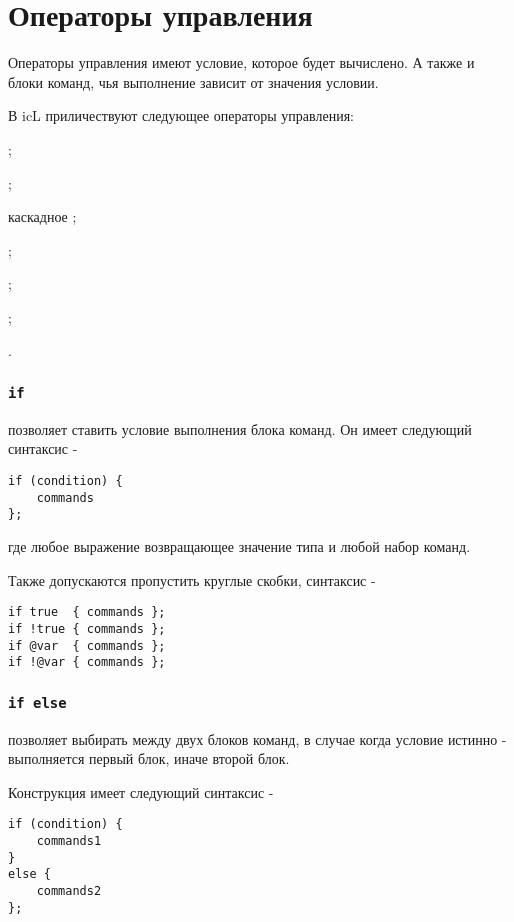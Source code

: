 \section{Операторы управления}

Операторы управления имеют условие, которое будет вычислено. А также и блоки команд, чья выполнение зависит от значения условии.

В icL приличествуют следующее операторы управления:
\begin{icItems}
	\item {};
	\item {};
	\item каскадное ;
	\item {};
	\item {};
	\item {};
	\item {}.
\end{icItems}

\subsubsection{\lstinline|if|}

 позволяет ставить условие выполнения блока команд. Он имеет следующий синтаксис -
\begin{lstlisting}[numbers=none]
if (condition) {
	commands
};
\end{lstlisting}
где  любое выражение возвращающее значение типа \bool{} и  любой набор команд.

Также допускаются пропустить круглые скобки, синтаксис -
\begin{lstlisting}[numbers=none]
if true  { commands };
if !true { commands };
if @var  { commands };
if !@var { commands };
\end{lstlisting}

\subsubsection{\lstinline|if else|}

 позволяет выбирать между двух блоков команд, в случае когда условие истинно - выполняется первый блок, иначе второй блок.

Конструкция  имеет следующий синтаксис -
\begin{lstlisting}[numbers=none]
if (condition) {
	commands1
}
else {
	commands2
};
\end{lstlisting}

